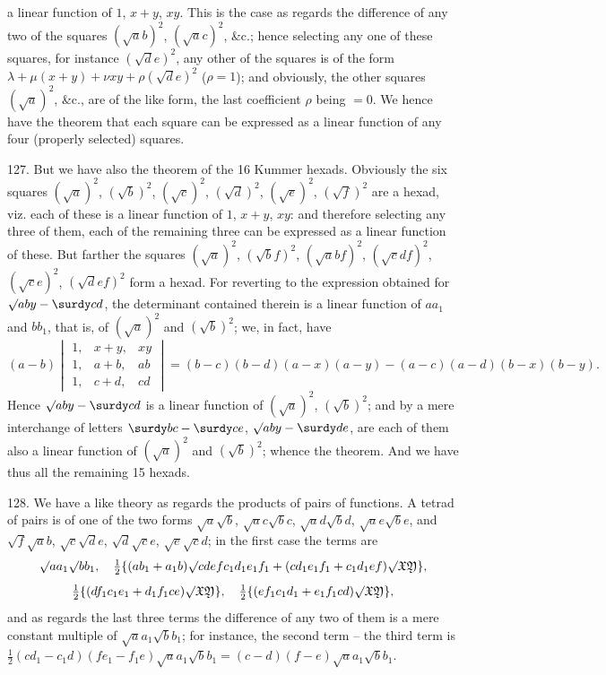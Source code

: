 \documentclass[11pt,a4paper]{book}
\begin{document}
\noindent
a linear function of $1$, $x + y$, $xy$. This is the case as regards the difference of any two of the squares $(\surd ab)^2$, $(\surd ac)^2$, \&c.; hence selecting any one of these squares, for instance $(\surd de)^2$, any other of the squares is of the form $\lambda + \mu(x + y) + \nu xy + \rho(\surd de)^2$ ($\rho = 1$); and obviously, the other squares $(\surd a)^2$, \&c., are of the like form, the last coefficient $\rho$ being $=0$. We hence have the theorem that each square can be expressed as a linear function of any four (properly selected) squares.

127. But we have also the theorem of the 16 Kummer hexads. Obviously the six squares $(\surd a)^2$, $(\surd b)^2$, $(\surd c)^2$, $(\surd d)^2$, $(\surd e)^2$, $(\surd f)^2$ are a hexad, viz. each of these is a linear function of $1$, $x + y$, $xy$: and therefore selecting any three of them, each of the remaining three can be expressed as a linear function of these. But farther the squares $(\surd a)^2$, $(\surd bf)^2$, $(\surd abf)^2$, $(\surd cdf)^2$, $(\surd ce)^2$, $(\surd def)^2$ form a hexad. For reverting to the expression obtained for $\surd aby - \surdy cd$, the determinant contained therein is a linear function of $aa_1$ and $bb_1$, that is, of $(\surd a)^2$ and $(\surd b)^2$; we, in fact, have
\[
(a - b)
\begin{vmatrix}
1, & x + y, & xy \\
1, & a + b, & ab \\
1, & c + d, & cd
\end{vmatrix}
= (b - c)(b - d)(a - x)(a - y) - (a - c)(a - d)(b - x)(b - y).
\]
Hence $\surd aby - \surdy cd$ is a linear function of $(\surd a)^2$, $(\surd b)^2$; and by a mere interchange of letters $\surdy bc - \surdy ce$, $\surd aby - \surdy de$, are each of them also a linear function of $(\surd a)^2$ and $(\surd b)^2$; whence the theorem. And we have thus all the remaining 15 hexads.

128. We have a like theory as regards the products of pairs of functions. A tetrad of pairs is of one of the two forms $\surd a\surd b$, $\surd ac\surd bc$, $\surd ad\surd bd$, $\surd ae\surd be$, and $\surd f\surd ab$, $\surd c\surd de$, $\surd d\surd ce$, $\surd e\surd cd$; in the first case the terms are
\[
\surd aa_1\surd bb_1,\quad
\tfrac12 \{(ab_1 + a_1 b)\surd cdefc_1 d_1 e_1 f_1 + (cd_1 e_1 f_1 + c_1 d_1 ef)\surd\mathfrak{XY}\},
\]
\[
\tfrac12 \{(df_1 c_1 e_1 + d_1 f_1 ce)\surd\mathfrak{XY}\},\quad
\tfrac12 \{(ef_1 c_1 d_1 + e_1 f_1 cd)\surd\mathfrak{XY}\},
\]
and as regards the last three terms the difference of any two of them is a mere constant multiple of $\surd aa_1\surd bb_1$; for instance, the second term -- the third term is $\tfrac12 (cd_1 - c_1 d)(fe_1 - f_1 e) \surd aa_1\surd bb_1 = (c - d)(f - e) \surd aa_1\surd bb_1$.
\end{document}
